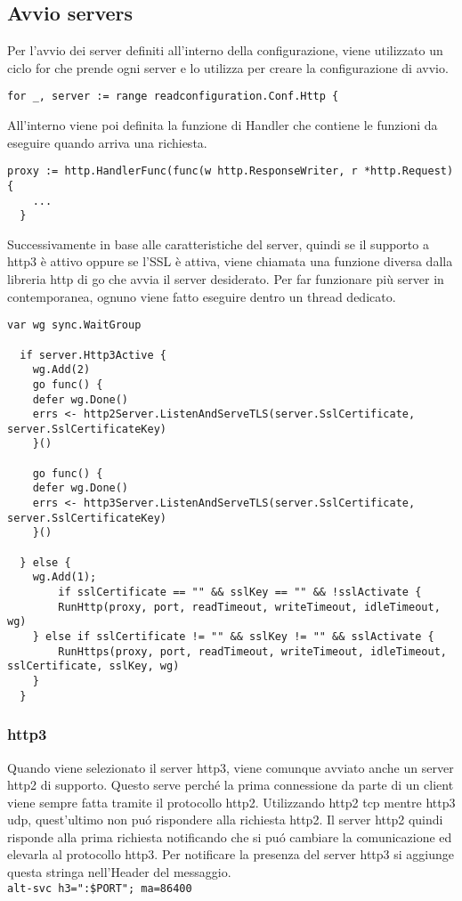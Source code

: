 \subsection{Avvio servers}
Per l'avvio dei server definiti all'interno della configurazione, viene utilizzato un ciclo for che prende ogni server e lo utilizza per creare la configurazione di avvio.
\begin{lstlisting}[language=Golang]
for _, server := range readconfiguration.Conf.Http {
\end{lstlisting}
All'interno viene poi definita la funzione di Handler che contiene le funzioni da eseguire quando arriva una richiesta.
\begin{lstlisting}[language=Golang]
  proxy := http.HandlerFunc(func(w http.ResponseWriter, r *http.Request) {
	...
  }
\end{lstlisting}
Successivamente in base alle caratteristiche del server, quindi se il supporto a http3 è attivo oppure se l'SSL è attiva, viene chiamata una funzione diversa dalla libreria http di go che avvia il server desiderato. Per far funzionare più server in contemporanea, ognuno viene fatto eseguire dentro un thread dedicato.

\begin{lstlisting}[language=Golang]
  var wg sync.WaitGroup

  if server.Http3Active {
	wg.Add(2)
	go func() {
  	defer wg.Done()
  	errs <- http2Server.ListenAndServeTLS(server.SslCertificate, server.SslCertificateKey)
	}()

	go func() {
  	defer wg.Done()
  	errs <- http3Server.ListenAndServeTLS(server.SslCertificate, server.SslCertificateKey)
	}()

  } else {
	wg.Add(1);
    	if sslCertificate == "" && sslKey == "" && !sslActivate {
    	RunHttp(proxy, port, readTimeout, writeTimeout, idleTimeout, wg)
	} else if sslCertificate != "" && sslKey != "" && sslActivate {
    	RunHttps(proxy, port, readTimeout, writeTimeout, idleTimeout, sslCertificate, sslKey, wg)
	}
  }
\end{lstlisting}
\subsubsection{http3}
Quando viene selezionato il server http3, viene comunque avviato anche un server http2 di supporto. Questo serve perché la prima connessione da parte di un client viene sempre fatta tramite il protocollo http2. Utilizzando http2 tcp mentre http3 udp, quest'ultimo non puó rispondere alla richiesta http2. Il server http2 quindi risponde alla prima richiesta notificando che si puó cambiare la comunicazione ed elevarla al protocollo http3. Per notificare la presenza del server http3 si aggiunge questa stringa nell'Header del messaggio.\\
\texttt{alt-svc h3=":\$PORT"; ma=86400}


